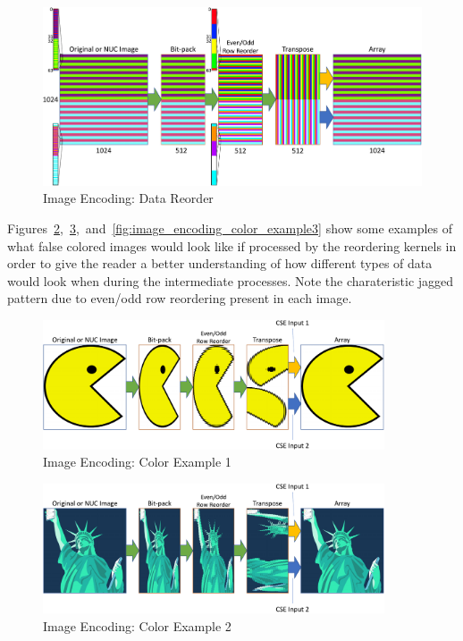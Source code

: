     \begin{figure}[H]
        \centering
        \includegraphics[width=1.0\textwidth]{fig/image_encoding_reorder.pdf}
        \caption{Image Encoding: Data Reorder}
        \label{fig:image_encoding_bitpack_reorder}
    \end{figure}

    Figures~\ref{fig:image_encoding_color_example1},~\ref{fig:image_encoding_color_example2},~and~\ref{fig:image_encoding_color_example3} show some examples of what false colored images would look like if processed by the reordering kernels in order to give the reader a better understanding of how different types of data would look when during the intermediate processes. Note the charateristic jagged pattern due to even/odd row reordering present in each image.

    \begin{figure}[H]
        \centering
        \includegraphics[trim=0 40pt 0 40pt,width=0.90\textwidth]{fig/image_encoding_pac.pdf}
        \caption{Image Encoding: Color Example 1}
        \label{fig:image_encoding_color_example1}
    \end{figure}

    \begin{figure}[H]
        \centering
        \includegraphics[trim=0 40pt 0 40pt,width=0.90\textwidth]{fig/image_encoding_liberty.pdf}
        \caption{Image Encoding: Color Example 2}
        \label{fig:image_encoding_color_example2}
    \end{figure}

